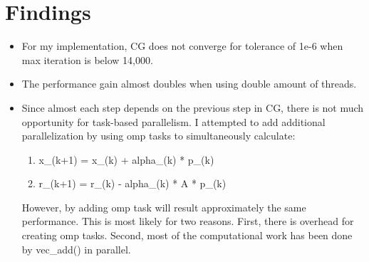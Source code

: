 \documentclass[a4paper,11pt,BCOR10mm,oneside,headsepline]{scrartcl}
\begin{document}
	\section{Findings}
		\begin{itemize}
			\item For my implementation, CG does not converge for tolerance of 1e-6 when max iteration is below 14,000.
			\item The performance gain almost doubles when using double amount of threads.
			\item Since almost each step depends on the previous step in CG, there is not much opportunity for task-based parallelism. I attempted to add additional parallelization by using omp  tasks to simultaneously calculate:
			\begin{enumerate}
				\item x\_(k+1) = x\_(k) + alpha\_(k) * p\_(k)
				\item r\_(k+1) = r\_(k) - alpha\_(k) * A * p\_(k)
			\end{enumerate}
			However, by adding omp task will result approximately the same performance. This is most likely for two reasons. First, there is overhead for creating omp tasks. Second, most of the computational work has been done by vec\_add() in parallel.
		\end{itemize}
	
\end{document}

